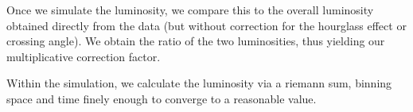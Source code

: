 Once we simulate the luminosity, we compare this to the overall luminosity
obtained directly from the data (but without correction for the hourglass effect
or crossing angle). We obtain the ratio of the two luminosities, thus yielding
our multiplicative correction factor.

Within the simulation, we calculate the luminosity via a riemann sum, binning
space and time finely enough to converge to a reasonable value.



